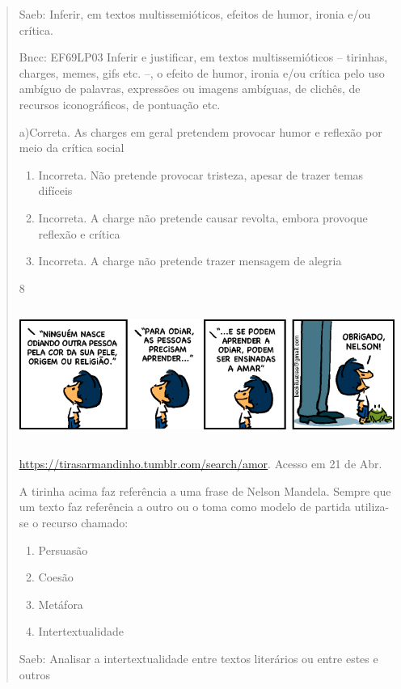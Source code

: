 {\begin{quote}
{\begin{itemize}
\begin{itemize}
Saeb: Inferir, em textos multissemióticos, efeitos de humor, ironia e/ou
crítica.

Bncc: EF69LP03 Inferir e justificar, em textos multissemióticos --
tirinhas, charges, memes, gifs etc. --, o efeito de humor, ironia e/ou
crítica pelo uso ambíguo de palavras, expressões ou imagens ambíguas, de
clichês, de recursos iconográficos, de pontuação etc.

a)Correta. As charges em geral pretendem provocar humor e reflexão por
meio da crítica social

\begin{enumerate}
\def\labelenumi{\arabic{enumi}.}
\item
  Incorreta. Não pretende provocar tristeza, apesar de trazer temas
  difíceis
\item
  Incorreta. A charge não pretende causar revolta, embora provoque
  reflexão e crítica
\item
  Incorreta. A charge não pretende trazer mensagem de alegria
\end{enumerate}

\num{8}

\includegraphics[width=5.90551in,height=1.72222in]{./imgSAEB_7_POR/media/image18.png}

\href{https://tirasarmandinho.tumblr.com/search/amor}{\uline{https://tirasarmandinho.tumblr.com/search/amor}}.
Acesso em 21 de Abr.

A tirinha acima faz referência a uma frase de Nelson Mandela. Sempre que
um texto faz referência a outro ou o toma como modelo de partida
utiliza-se o recurso chamado:

\begin{enumerate}

\item
  Persuasão
\item
  Coesão
\item
  Metáfora
\item
  Intertextualidade
\end{enumerate}

Saeb: Analisar a intertextualidade entre textos literários ou entre
estes e outros


\end{itemize}
\end{itemize}}
\end{quote}}

